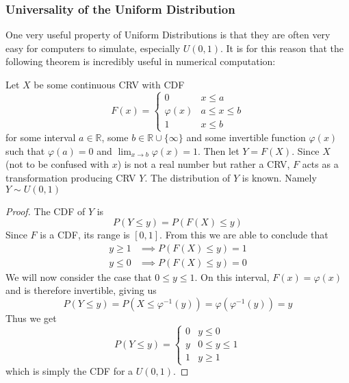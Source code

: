 \documentclass{report}
\begin{document}
\subsubsection{Universality of the Uniform Distribution}
One very useful property of Uniform Distributions is that they are often very easy for computers to simulate, especially $U(0,1)$. It is for this reason that the following theorem is incredibly useful in numerical computation:
\begin{theorem}
    Let $X$ be some continuous CRV with CDF 
    \[
        F(x)=\begin{cases}
            0 & x\le a
            \\
            \varphi(x) & a\le x \le b
            \\
            1 & x\le b
        \end{cases}
    \]
    for some interval $a\in\mathbb R$, some $b\in\mathbb R\cup\{\infty\}$ and some invertible function $\varphi(x)$ such that $\varphi(a)=0$ and $\lim_{x\to b}\varphi(x)=1$. Then let $Y=F(X)$. Since $X$ (not to be confused with $x$) is not a real number but rather a CRV, $F$ acts as a transformation producing CRV $Y$. The distribution of $Y$ is known. Namely $Y\sim U(0,1)$
    \begin{proof}
        The CDF of $Y$ is 
        \[
            P(Y\le y)= P(F(X)\le y)
        \]
        Since $F$ is a CDF, its range is $[0,1]$. From this we are able to conclude that 
        \begin{align*}
            y\ge 1 &\implies P(F(X)\le y)=1
            \\
            y\le 0 &\implies P(F(X)\le y)=0
        \end{align*}
        We will now consider the case that $0 \le y\le 1$. On this interval, $F(x)=\varphi(x)$ and is therefore invertible, giving us
        \[
            P(Y\le y)=P(X\le\varphi^{-1}(y))=\varphi(\varphi^{-1}(y))=y
        \]
        Thus we get
        \[
            P(Y\le y)=\begin{cases}
                0 & y \le 0
                \\
                y & 0\le y \le 1
                \\
                1 & y \ge 1
            \end{cases}
        \]
        which is simply the CDF for a $U(0,1)$.
    \end{proof}
\end{theorem}
\end{document}
